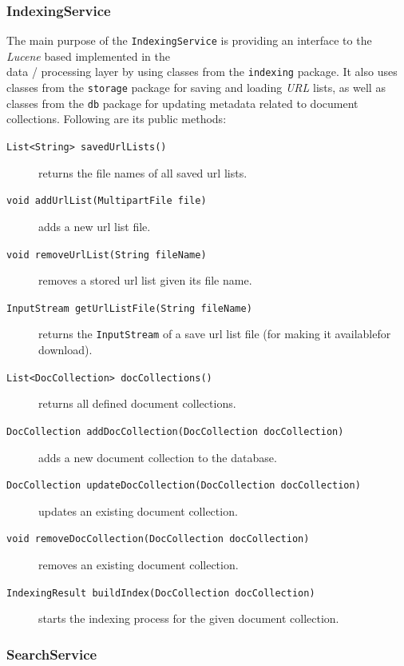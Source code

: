 \documentclass[a4paper]{usiinfbachelorproject}
\begin{document}
\subsubsection{\textbf{IndexingService}}

The main purpose of the \texttt{IndexingService} is providing an interface to the \emph{Lucene} based 
implemented in the \\ data / processing layer by using classes from the \texttt{indexing} package. It
also uses classes from the \texttt{storage} package for saving and loading \emph{URL} lists, as well as
classes from the \texttt{db} package for updating metadata related to document collections. Following are its public methods:

    \begin{description}

        \item[\texttt{List<String> savedUrlLists()}] returns the file names of all saved url lists.
        \item[\texttt{void addUrlList(MultipartFile file)}] adds a new url list file.
        \item[\texttt{void removeUrlList(String fileName)}] removes a stored url list given its file name.
        \item[\texttt{InputStream getUrlListFile(String fileName)}] returns the \texttt{InputStream} of a save url list file 
                        (for making it availablefor download).
        \item[\texttt{List<DocCollection> docCollections()}] returns all defined document collections.
        \item[\texttt{DocCollection addDocCollection(DocCollection docCollection)}] adds a new document collection to the database.
        \item[\texttt{DocCollection updateDocCollection(DocCollection docCollection)}] updates an existing document collection.
        \item[\texttt{void removeDocCollection(DocCollection docCollection)}] removes an existing document collection.
        \item[\texttt{IndexingResult buildIndex(DocCollection docCollection)}] starts the indexing process for the given document collection.

    \end{description}

\subsubsection{\textbf{SearchService}}\label{sec:archServiceSearch}
\end{document}
